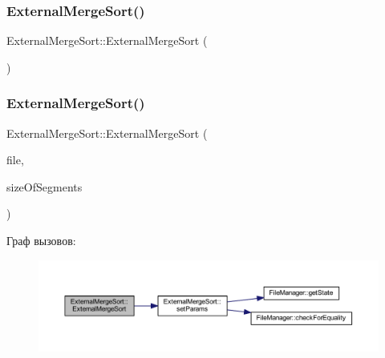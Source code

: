 \subsubsection{\texorpdfstring{External\+Merge\+Sort()}{ExternalMergeSort()}\hspace{0.1cm}{\footnotesize\ttfamily [1/2]}}
{\footnotesize\ttfamily External\+Merge\+Sort\+::\+External\+Merge\+Sort (\begin{DoxyParamCaption}{ }\end{DoxyParamCaption})}

\hypertarget{class_external_merge_sort_a37df182916b341d5466f2fff0d50dfed}{}\label{class_external_merge_sort_a37df182916b341d5466f2fff0d50dfed} 
\subsubsection{\texorpdfstring{External\+Merge\+Sort()}{ExternalMergeSort()}\hspace{0.1cm}{\footnotesize\ttfamily [2/2]}}
{\footnotesize\ttfamily External\+Merge\+Sort\+::\+External\+Merge\+Sort (\begin{DoxyParamCaption}\item[{\hyperlink{class_file_manager}{File\+Manager} $\ast$}]{file,  }\item[{long long}]{size\+Of\+Segments }\end{DoxyParamCaption})}

Граф вызовов\+:\nopagebreak
\begin{figure}[H]
\begin{center}
\leavevmode
\includegraphics[width=350pt]{class_external_merge_sort_a37df182916b341d5466f2fff0d50dfed_cgraph}
\end{center}
\end{figure}
\hypertarget{class_external_merge_sort_adfee7073120e0ae832c96977440b2fb4}{}\label{class_external_merge_sort_adfee7073120e0ae832c96977440b2fb4} 
